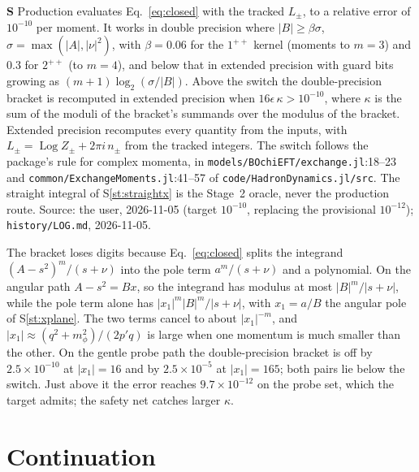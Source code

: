 \documentclass[11pt]{article}
\newcommand{\file}[1]{\nolinkurl{#1}}
\newcounter{stmt}
\newenvironment{stmt}[1]{\par\smallskip\refstepcounter{stmt}\noindent\textbf{S\thestmt}\enspace[\textsf{#1}]\enspace\ignorespaces}{\par\smallskip}
\newcommand{\Sr}[1]{S\ref{#1}}
\begin{document}
\begin{stmt}{definition}\label{st:evaluation}
Production evaluates Eq.~\eqref{eq:closed} with the tracked $L_\pm$, to a relative error of $10^{-10}$ per moment. It works in double precision where $|B|\ge\beta\sigma$, $\sigma=\max(|A|,|\nu|^2)$, with $\beta=0.06$ for the $1^{++}$ kernel (moments to $m=3$) and $0.3$ for $2^{++}$ (to $m=4$), and below that in extended precision with guard bits growing as $(m+1)\log_2(\sigma/|B|)$. Above the switch the double-precision bracket is recomputed in extended precision when $16\epsilon\,\kappa>10^{-10}$, where $\kappa$ is the sum of the moduli of the bracket's summands over the modulus of the bracket. Extended precision recomputes every quantity from the inputs, with $L_\pm=\operatorname{Log}Z_\pm+2\pi i\,n_\pm$ from the tracked integers. The switch follows the package's rule for complex momenta, in \file{models/BOchiEFT/exchange.jl}:18--23 and \file{common/ExchangeMoments.jl}:41--57 of \file{code/HadronDynamics.jl/src}. The straight integral of \Sr{st:straightx} is the Stage~2 oracle, never the production route. Source: the user, 2026-11-05 (target $10^{-10}$, replacing the provisional $10^{-12}$); \file{history/LOG.md}, 2026-11-05.
\end{stmt}
\noindent The bracket loses digits because Eq.~\eqref{eq:closed} splits the integrand $(A-s^2)^m/(s+\nu)$ into the pole term $a^m/(s+\nu)$ and a polynomial. On the angular path $A-s^2=Bx$, so the integrand has modulus at most $|B|^m/|s+\nu|$, while the pole term alone has $|x_1|^m|B|^m/|s+\nu|$, with $x_1=a/B$ the angular pole of \Sr{st:xplane}. The two terms cancel to about $|x_1|^{-m}$, and $|x_1|\approx(q^2+m_\phi^2)/(2p'q)$ is large when one momentum is much smaller than the other. On the gentle probe path the double-precision bracket is off by $2.5\times10^{-10}$ at $|x_1|=16$ and by $2.5\times10^{-5}$ at $|x_1|=165$; both pairs lie below the switch. Just above it the error reaches $9.7\times10^{-12}$ on the probe set, which the target admits; the safety net catches larger $\kappa$.

\section{Continuation}\label{sec:continuation}
\end{document}
